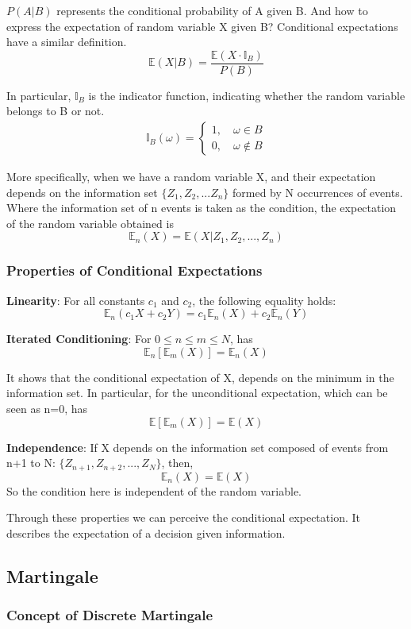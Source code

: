 \documentclass[11pt]{article} %
\begin{document}
$P(A|B)$ represents the conditional probability of A given B. And how to express the expectation of random variable X given B? Conditional expectations have a similar definition.
$$
\mathbb E(X|B) = \frac{\mathbb E(X\cdot \mathbb{I}_B)}{P(B)}
$$

In particular, $\mathbb{I}_B$ is the indicator function, indicating whether the random variable belongs to B or not.
$$
\begin{aligned}
\mathbb{I}_B(\omega)
=\begin{cases}
1,\quad \omega \in B\\
0, \quad \omega \notin B
\end{cases}
\end{aligned}
$$

More specifically, when we have a random variable X, and their expectation depends on the information set $\{Z_1,Z_2,...Z_n\}$ formed by N occurrences of events. Where the information set of n events is taken as the condition, the expectation of the random variable obtained is
$$
\mathbb E_n(X) = \mathbb E(X|Z_1,Z_2,...,Z_n)
$$
\subsubsection{Properties of Conditional Expectations}
\textbf{Linearity}: For all constants $c_1$ and $c_2$, the following equality holds:
$$
\mathbb E_n(c_1X+c_2Y) = c_1\mathbb E_n(X) + c_2\mathbb E_n(Y)
$$

\textbf{Iterated Conditioning}: For $0 \leq n \leq m \leq N$, has
$$
	\mathbb E_n[\mathbb E_m(X)] = \mathbb E_n(X)
$$ 

It shows that the conditional expectation of X, depends on the minimum in the information set. In particular, for the unconditional expectation, which can be seen as n=0, has
$$
	\mathbb E[\mathbb E_m(X)] = \mathbb E(X)
$$

\textbf{Independence}: If X depends on the information set composed of events from n+1 to N: $\{Z_{n+1},Z_{n+2},...,Z_N\}$, then,
$$
\mathbb E_n(X) = \mathbb E(X)
$$
So the condition here is independent of the random variable.

Through these properties we can perceive the conditional expectation. It describes the expectation of a decision given information.
\subsection{Martingale}
\subsubsection{Concept of Discrete Martingale}
\end{document}
